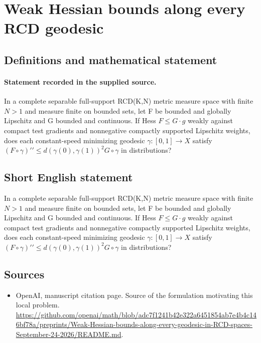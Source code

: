 \documentclass[11pt]{article}
\begin{document}
\section*{Weak Hessian bounds along every RCD geodesic}\label{30007155}
\subsection{Definitions and mathematical statement}
\paragraph{Statement recorded in the supplied source.}
In a complete separable full-support RCD(K,N) metric measure space with finite $N>1$ and measure finite on bounded sets, let F be bounded and globally Lipschitz and G bounded and continuous. If Hess $F\leq G\cdot g$ weakly against compact test gradients and nonnegative compactly supported Lipschitz weights, does each constant-speed minimizing geodesic $\gamma :[0,1]\to X$ satisfy $(F\circ \gamma )\prime\prime \leq d(\gamma (0),\gamma (1))^{2}G\circ \gamma $ in distributions?
\subsection{Short English statement}
In a complete separable full-support RCD(K,N) metric measure space with finite $N>1$ and measure finite on bounded sets, let F be bounded and globally Lipschitz and G bounded and continuous. If Hess $F\leq G\cdot g$ weakly against compact test gradients and nonnegative compactly supported Lipschitz weights, does each constant-speed minimizing geodesic $\gamma :[0,1]\to X$ satisfy $(F\circ \gamma )\prime\prime \leq d(\gamma (0),\gamma (1))^{2}G\circ \gamma $ in distributions?
\subsection{Sources}
\begin{itemize}
\item[S1] OpenAI, manuscript citation page. Source of the formulation motivating this local problem.
\url{https://github.com/openai/math/blob/adc7f1241b42e322a6451854ab7e4b4c146bf78a/preprints/Weak-Hessian-bounds-along-every-geodesic-in-RCD-spaces-September-24-2026/README.md}.
\end{itemize}
\end{document}
